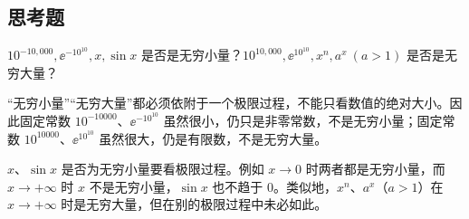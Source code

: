 \subsection{思考题}

\begin{xthought}[1]
$10^{-10,000},\ee^{-10^{10}},x,\sin x$ 是否是无穷小量？$10^{10,000},\ee^{10^{10}},x^n,a^x\ (a>1)$ 是否是无穷大量？
\end{xthought}
\begin{xsolution}
“无穷小量”“无穷大量”都必须依附于一个极限过程，不能只看数值的绝对大小。因此固定常数
$10^{-10000}$、$\ee^{-10^{10}}$ 虽然很小，仍只是非零常数，不是无穷小量；固定常数
$10^{10000}$、$\ee^{10^{10}}$ 虽然很大，仍是有限数，不是无穷大量。

$x$、$\sin x$ 是否为无穷小量要看极限过程。例如 $x\to0$ 时两者都是无穷小量，而 $x\to+\infty$ 时 $x$ 不是无穷小量，$\sin x$ 也不趋于 0。类似地，$x^n$、$a^x$（$a>1$）在 $x\to+\infty$ 时是无穷大量，但在别的极限过程中未必如此。
\end{xsolution}



